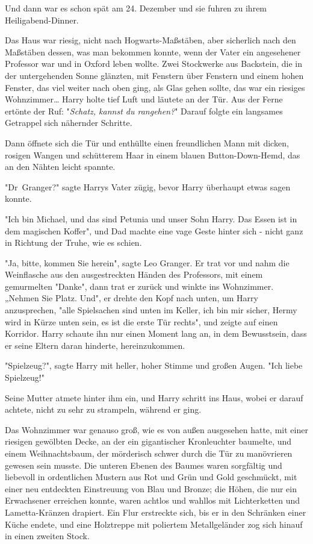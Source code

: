 {Und dann war es schon spät am 24. Dezember und sie fuhren zu ihrem Heiligabend-Dinner.

Das Haus war riesig, nicht nach Hogwarts-Maßstäben, aber sicherlich nach den Maßstäben dessen, was man bekommen konnte, wenn der Vater ein angesehener Professor war und in Oxford leben wollte. Zwei Stockwerke aus Backstein, die in der untergehenden Sonne glänzten, mit Fenstern über Fenstern und einem hohen Fenster, das viel weiter nach oben ging, als Glas gehen sollte, das war ein riesiges Wohnzimmer… Harry holte tief Luft und läutete an der Tür. Aus der Ferne ertönte der Ruf: "\emph{Schatz, kannst du rangehen?}" Darauf folgte ein langsames Getrappel sich nähernder Schritte.

Dann öffnete sich die Tür und enthüllte einen freundlichen Mann mit dicken, rosigen Wangen und schütterem Haar in einem blauen Button-Down-Hemd, das an den Nähten leicht spannte.

"Dr~Granger?" sagte Harrys Vater zügig, bevor Harry überhaupt etwas sagen konnte.

"Ich bin Michael, und das sind Petunia und unser Sohn Harry. Das Essen ist in dem magischen Koffer", und Dad machte eine vage Geste hinter sich - nicht ganz in Richtung der Truhe, wie es schien.

"Ja, bitte, kommen Sie herein", sagte Leo Granger. Er trat vor und nahm die Weinflasche aus den ausgestreckten Händen des Professors, mit einem gemurmelten "Danke", dann trat er zurück und winkte ins Wohnzimmer. „Nehmen Sie Platz. Und", er drehte den Kopf nach unten, um Harry anzusprechen, "alle Spielsachen sind unten im Keller, ich bin mir sicher, Hermy wird in Kürze unten sein, es ist die erste Tür rechts", und zeigte auf einen Korridor. Harry schaute ihn nur einen Moment lang an, in dem Bewusstsein, dass er seine Eltern daran hinderte, hereinzukommen.

"Spielzeug?", sagte Harry mit heller, hoher Stimme und großen Augen. "Ich liebe Spielzeug!"

Seine Mutter atmete hinter ihm ein, und Harry schritt ins Haus, wobei er darauf achtete, nicht zu sehr zu strampeln, während er ging.

Das Wohnzimmer war genauso groß, wie es von außen ausgesehen hatte, mit einer riesigen gewölbten Decke, an der ein gigantischer Kronleuchter baumelte, und einem Weihnachtsbaum, der mörderisch schwer durch die Tür zu manövrieren gewesen sein musste. Die unteren Ebenen des Baumes waren sorgfältig und liebevoll in ordentlichen Mustern aus Rot und Grün und Gold geschmückt, mit einer neu entdeckten Einstreuung von Blau und Bronze; die Höhen, die nur ein Erwachsener erreichen konnte, waren achtlos und wahllos mit Lichterketten und Lametta-Kränzen drapiert. Ein Flur erstreckte sich, bis er in den Schränken einer Küche endete, und eine Holztreppe mit poliertem Metallgeländer zog sich hinauf in einen zweiten Stock.

}
